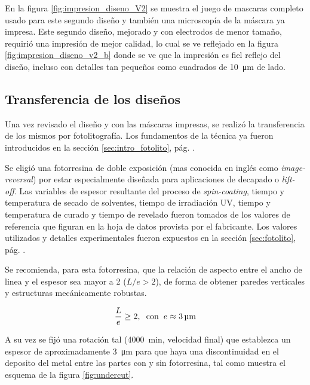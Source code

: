 {		     En la figura \ref{fig:impresion_diseno_V2} se muestra el juego de mascaras completo usado para este segundo diseño y también una microscopía de la máscara ya impresa. Este segundo diseño, mejorado y con electrodos de menor tamaño, requirió una impresión de mejor calidad, lo cual se ve reflejado en la figura \ref{fig:impresion_diseno_v2_b} donde se ve que la impresión es fiel reflejo del diseño, incluso con detalles tan pequeños como cuadrados de \SI{10}{\um} de lado. 
				
 		\subsection{Transferencia de los diseños}

 			 Una vez revisado el diseño y con las máscaras impresas, se realizó la transferencia de los mismos por fotolitografía. Los fundamentos de la técnica ya fueron introducidos en la sección \ref{sec:intro_fotolito}, pág. \pageref{sec:intro_fotolito}.

 			 Se eligió una fotorresina de doble exposición (mas conocida en inglés como \textit{image-reversal}) por estar especialmente diseñada  para aplicaciones de decapado o \textit{lift-off}. Las variables de espesor resultante del proceso de \textit{spin-coating}, tiempo y temperatura de secado de solventes, tiempo de irradiación UV, tiempo y temperatura de curado y tiempo de revelado fueron tomados de los valores de referencia que figuran en la hoja de datos provista por el fabricante. \cite{TI35E} Los valores utilizados y detalles experimentales fueron expuestos en la sección \ref{sec:fotolito}, pág. \pageref{sec:fotolito}.

 			 Se recomienda, para esta fotorresina, que la relación de aspecto entre el ancho de linea y el espesor sea mayor a 2 ($L/e>2$), de forma de obtener paredes verticales y estructuras mecánicamente robustas. 

 				\begin{equation}
				\frac{L}{e} \geq 2, \hspace*{0.2cm}\text{con}\hspace{0.2cm}  e \approx \SI{3}{\um}		
 				\end{equation}

     		 A su vez se fijó una rotación tal (\SI{4000}{\minute}, velocidad final) que establezca un espesor de aproximadamente \SI{3}{\um} para que haya una discontinuidad en el deposito del metal entre las partes con y sin fotorresina, tal como muestra el esquema de la figura \ref{fig:undercut}.

}
